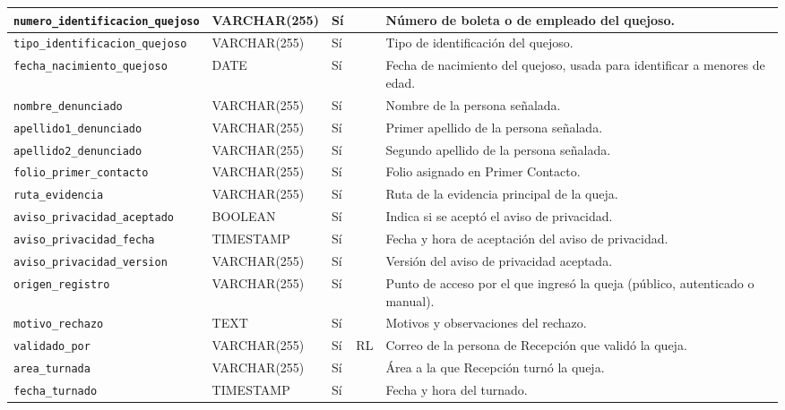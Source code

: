 \begin{longtable}{|L{3.9cm}|L{2.4cm}|L{0.9cm}|L{1.2cm}|L{6.6cm}|}
		\texttt{numero\_\allowbreak{}identificacion\_\allowbreak{}quejoso} & VARCHAR(255) & Sí &  & Número de boleta o de empleado del quejoso. \\ \hline
		\texttt{tipo\_\allowbreak{}identificacion\_\allowbreak{}quejoso} & VARCHAR(255) & Sí &  & Tipo de identificación del quejoso. \\ \hline
		\texttt{fecha\_\allowbreak{}nacimiento\_\allowbreak{}quejoso} & DATE & Sí &  & Fecha de nacimiento del quejoso, usada para identificar a menores de edad. \\ \hline
		\texttt{nombre\_\allowbreak{}denunciado} & VARCHAR(255) & Sí &  & Nombre de la persona señalada. \\ \hline
		\texttt{apellido1\_\allowbreak{}denunciado} & VARCHAR(255) & Sí &  & Primer apellido de la persona señalada. \\ \hline
		\texttt{apellido2\_\allowbreak{}denunciado} & VARCHAR(255) & Sí &  & Segundo apellido de la persona señalada. \\ \hline
		\texttt{folio\_\allowbreak{}primer\_\allowbreak{}contacto} & VARCHAR(255) & Sí &  & Folio asignado en Primer Contacto. \\ \hline
		\texttt{ruta\_\allowbreak{}evidencia} & VARCHAR(255) & Sí &  & Ruta de la evidencia principal de la queja. \\ \hline
		\texttt{aviso\_\allowbreak{}privacidad\_\allowbreak{}aceptado} & BOOLEAN & Sí &  & Indica si se aceptó el aviso de privacidad. \\ \hline
		\texttt{aviso\_\allowbreak{}privacidad\_\allowbreak{}fecha} & TIMESTAMP & Sí &  & Fecha y hora de aceptación del aviso de privacidad. \\ \hline
		\texttt{aviso\_\allowbreak{}privacidad\_\allowbreak{}version} & VARCHAR(255) & Sí &  & Versión del aviso de privacidad aceptada. \\ \hline
		\texttt{origen\_\allowbreak{}registro} & VARCHAR(255) & Sí &  & Punto de acceso por el que ingresó la queja (público, autenticado o manual). \\ \hline
		\texttt{motivo\_\allowbreak{}rechazo} & TEXT & Sí &  & Motivos y observaciones del rechazo. \\ \hline
		\texttt{validado\_\allowbreak{}por} & VARCHAR(255) & Sí & RL & Correo de la persona de Recepción que validó la queja. \\ \hline
		\texttt{area\_\allowbreak{}turnada} & VARCHAR(255) & Sí &  & Área a la que Recepción turnó la queja. \\ \hline
		\texttt{fecha\_\allowbreak{}turnado} & TIMESTAMP & Sí &  & Fecha y hora del turnado. \\ \hline

\end{longtable}
